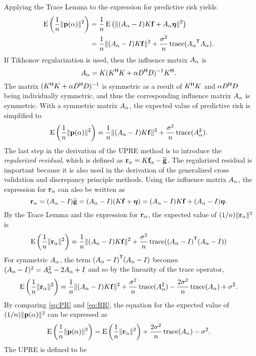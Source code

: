 \noindent Applying the Trace Lemma to the expression for predictive risk yields
\begin{align*}
    \operatorname{E}\left(\frac{1}{n}\|\mathbf{p}(\alpha)\|^2\right) &= \frac{1}{n}\operatorname{E}\left(\|(A_{\alpha}-I)K\mathbf{f} + A_{\alpha}\boldsymbol{\eta}\|^2\right) \\
    &= \frac{1}{n}\|(A_{\alpha}-I)K\mathbf{f}\|^2 + \frac{\sigma^2}{n}\operatorname{trace}({{A_{\alpha}}^\mathsf{T}}A_{\alpha}).
\end{align*}
If Tikhonov regularization is used, then the influence matrix $A_{\alpha}$ is
\[A_{\alpha} = K({K}^\mathsf{H}K + \alpha{{D}^\mathsf{H}}D)^{-1}{K}^\mathsf{H}.\]
The matrix $({K}^\mathsf{H}K + \alpha{{D}^\mathsf{H}}D)^{-1}$ is symmetric as a result of ${K}^\mathsf{H}K$ and $\alpha{D}^\mathsf{H}D$ being individually symmetric, and thus the corresponding influence matrix $A_{\alpha}$ is symmetric.  With a symmetric matrix $A_{\alpha}$, the expected value of predictive risk is simplified to
\begin{equation}
\label{eq:PR}
\operatorname{E}\left(\frac{1}{n}\|\mathbf{p}(\alpha)\|^2\right) = \frac{1}{n}\|(A_{\alpha}-I)K\mathbf{f}\|^2 + \frac{\sigma^2}{n}\operatorname{trace}(A_{\alpha}^2).
\end{equation}
\indent The last step in the derivation of the UPRE method is to introduce the \textit{regularized residual}, which is defined as $\mathbf{r}_{\alpha} = K\mathbf{f}_{\alpha} - \widetilde{\mathbf{g}}$. The regularized residual is important because it is also used in the derivation of the generalized cross validation and discrepancy principle methods. Using the influence matrix $A_{\alpha}$, the expression for $\mathbf{r}_{\alpha}$ can also be written as
\[\mathbf{r}_{\alpha} = (A_{\alpha}-I)\widetilde{\mathbf{g}} = (A_{\alpha}-I)(K\mathbf{f} + \boldsymbol{\eta}) = (A_{\alpha}-I)K\mathbf{f} + (A_{\alpha}-I)\boldsymbol{\eta}.\]
By the Trace Lemma and the expression for $\mathbf{r}_{\alpha}$, the expected value of $(1/n)\|\mathbf{r}_{\alpha}\|^2$ is
\[\operatorname{E}\left(\frac{1}{n}\|\mathbf{r}_{\alpha}\|^2\right) = \frac{1}{n}\|(A_{\alpha}-I)K\mathbf{f}\|^2 + \frac{\sigma^2}{n}\operatorname{trace}({{(A_{\alpha}-I)}^\mathsf{T}}(A_{\alpha}-I))\]
For symmetric $A_{\alpha}$, the term ${(A_{\alpha}-I)}^\mathsf{T}(A_{\alpha}-I)$ becomes $(A_{\alpha}-I)^2 = A_{\alpha}^2 - 2A_{\alpha} + I$ and so by the linearity of the trace operator,
\begin{equation}
\label{eq:RR}
\operatorname{E}\left(\frac{1}{n}\|\mathbf{r}_{\alpha}\|^2\right) = \frac{1}{n}\|(A_{\alpha}-I)K\mathbf{f}\|^2 + \frac{\sigma^2}{n}\operatorname{trace}(A_{\alpha}^2) - \frac{2\sigma^2}{n}\operatorname{trace}(A_{\alpha}) + \sigma^2.
\end{equation}
By comparing \eqref{eq:PR} and \eqref{eq:RR}, the equation for the expected value of $(1/n)\|\mathbf{p}(\alpha)\|^2$ can be expressed as
\[\operatorname{E}\left(\frac{1}{n}\|\mathbf{p}(\alpha)\|^2\right) = \operatorname{E}\left(\frac{1}{n}\|\mathbf{r}_{\alpha}\|^2\right) + \frac{2\sigma^2}{n}\operatorname{trace}(A_{\alpha}) - \sigma^2.\]
The UPRE is defined to be
